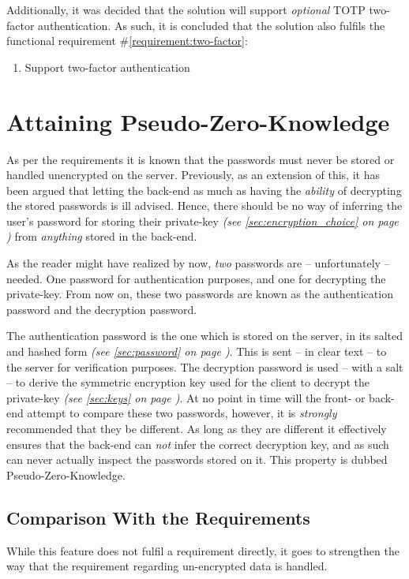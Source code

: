 			Additionally, it was decided that the solution will support \emph{optional} TOTP two-factor authentication. As such, it is concluded that the solution also fulfils the functional requirement \#\ref{requirement:two-factor}:
			\vspace{-3ex}\begin{enumerate}
				\setlength\itemsep{0.1em}
				\setcounter{enumi}{16-1}
				\item Support two-factor authentication
			\end{enumerate}

	\section{Attaining Pseudo-Zero-Knowledge}
		As per the requirements it is known that the passwords must never be stored or handled unencrypted on the server. Previously, as an extension of this, it has been argued that letting the back-end as much as having the \emph{ability} of decrypting the stored passwords is ill advised. Hence, there should be no way of inferring the user's password for storing their private-key \emph{(see \ref{sec:encryption_choice} on page \pageref{sec:encryption_choice})} from \emph{anything} stored in the back-end.

		As the reader might have realized by now, \emph{two} passwords are -- unfortunately -- needed. One password for authentication purposes, and one for decrypting the private-key. From now on, these two passwords are known as the authentication password and the decryption password.
 
		The authentication password is the one which is stored on the server, in its salted and hashed form \emph{(see \ref{sec:password} on page \pageref{sec:password})}. This is sent -- in clear text -- to the server for verification purposes. The decryption password is used -- with a salt -- to derive the symmetric encryption key used for the client to decrypt the private-key \emph{(see \ref{sec:keys} on page \pageref{sec:keys})}. At no point in time will the front- or back-end attempt to compare these two passwords, however, it is \emph{strongly} recommended that they be different. As long as they are different it effectively ensures that the back-end can \emph{not} infer the correct decryption key, and as such can never actually inspect the passwords stored on it. This property is dubbed Pseudo-Zero-Knowledge.

		\subsection{Comparison With the Requirements}
			While this feature does not fulfil a requirement directly, it goes to strengthen the way that the requirement regarding un-encrypted data is handled.

